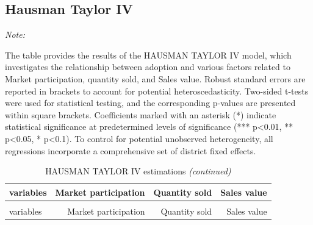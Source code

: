 \documentclass[
]{article}
\begin{document}
\hypertarget{hausman-taylor-iv}{%
\subsection{Hausman Taylor IV}\label{hausman-taylor-iv}}

\begingroup\fontsize{7}{9}\selectfont

\begin{ThreePartTable}
\begin{TableNotes}[para]
\item \textit{Note: } 
\item The table provides the results of the HAUSMAN TAYLOR IV model, which investigates the relationship between adoption and various factors related to Market participation, quantity sold, and Sales value. Robust standard errors are reported in brackets to account for potential heteroscedasticity. Two-sided t-tests were used for statistical testing, and the corresponding p-values are presented within square brackets. Coefficients marked with an asterisk (*) indicate statistical significance at predetermined levels of significance (*** p<0.01, ** p<0.05, * p<0.1). To control for potential unobserved heterogeneity, all regressions incorporate a comprehensive set of district fixed effects.
\end{TableNotes}
\begin{longtable}[t]{lrrr}
\caption{\label{tab:unnamed-chunk-14}HAUSMAN TAYLOR IV estimations}\\
\toprule
variables & Market participation & Quantity sold & Sales value\\
\midrule
\endfirsthead
\caption[]{\label{tab:unnamed-chunk-14}HAUSMAN TAYLOR IV estimations \textit{(continued)}}\\
\toprule
variables & Market participation & Quantity sold & Sales value\\
\midrule
\endhead


\end{longtable}
\end{ThreePartTable}
\end{document}
